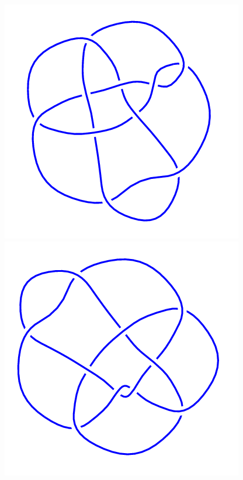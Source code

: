 \begin{figure}[H]
	\begin{minipage}[b]{.18\linewidth}
		\centering
		\includegraphics[width=\linewidth]{../data/10_117.png}
	\end{minipage}
	\begin{minipage}[b]{.18\linewidth}
		\centering
		\includegraphics[width=\linewidth]{../data/10_118.png}

\end{minipage}
\end{figure}

